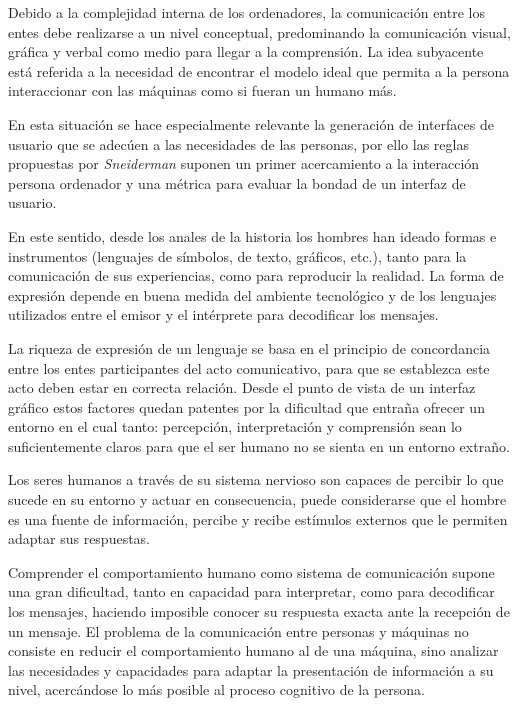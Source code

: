 Debido a la complejidad interna de los ordenadores, la comunicación entre los entes debe realizarse 
a un nivel conceptual, predominando la comunicación visual, gráfica y verbal como medio para llegar 
a la comprensión. La idea subyacente está referida a la necesidad de encontrar el modelo ideal que permita a la persona 
interaccionar con las máquinas como si fueran un humano más.

En esta situación se hace especialmente relevante la generación de interfaces de usuario 
que se adecúen a las necesidades de las personas, por ello las reglas propuestas por 
\textit{Sneiderman} suponen un primer acercamiento a la interacción persona ordenador y una 
métrica para evaluar la bondad de un interfaz de usuario.

En este sentido, desde los anales de la historia los hombres han ideado formas e instrumentos
(lenguajes de símbolos, de texto, gráficos, etc.), tanto para la comunicación de sus experiencias, 
como para reproducir la realidad. La forma de expresión depende en buena medida del ambiente 
tecnológico y de los lenguajes utilizados entre el emisor y el intérprete para decodificar los mensajes. 

La riqueza de expresión de un lenguaje se basa en el principio de concordancia entre los entes 
participantes del acto comunicativo, para que se establezca este acto deben estar en correcta relación. 
Desde el punto de vista de un interfaz gráfico estos factores quedan patentes por la dificultad 
que entraña ofrecer un entorno en el cual tanto: percepción, interpretación y comprensión sean 
lo suficientemente claros para que el ser humano no se sienta en un entorno extraño.

Los seres humanos a través de su sistema nervioso son capaces de percibir 
lo que sucede en su entorno y actuar en consecuencia, puede considerarse que el hombre es una fuente de información, percibe 
y recibe estímulos externos que le permiten adaptar sus respuestas. 

Comprender el comportamiento humano como sistema de comunicación supone una gran dificultad, 
tanto en capacidad para interpretar, como para decodificar los mensajes, haciendo imposible 
conocer su respuesta exacta ante la recepción de un mensaje. El problema de la comunicación entre personas y 
máquinas no consiste en reducir el comportamiento humano al de una máquina, sino analizar 
las necesidades y capacidades para adaptar la presentación de información a su nivel, acercándose 
lo más posible al proceso cognitivo de la persona.

